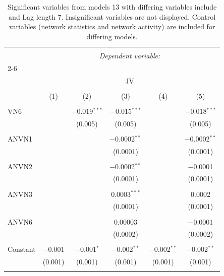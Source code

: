 
\begin{table}[!htbp] \centering 
  \caption{Significant variables from models 13 with differing variables include 
                               and Lag length 7. Insignificant variables are not displayed. 
                               Control variables (network statistics and network activity) are 
                               included for differing models.} 
  \label{Jmodels1_t} 
\scriptsize 
\begin{tabular}{@{\extracolsep{5pt}}lccccc} 
\\[-1.8ex]\hline 
\hline \\[-1.8ex] 
 & \multicolumn{5}{c}{\textit{Dependent variable:}} \\ 
\cline{2-6} 
\\[-1.8ex] & \multicolumn{5}{c}{JV} \\ 
\\[-1.8ex] & (1) & (2) & (3) & (4) & (5)\\ 
\hline \\[-1.8ex] 
 VN6 &  & $-$0.019$^{***}$ & $-$0.015$^{***}$ &  & $-$0.018$^{***}$ \\ 
  &  & (0.005) & (0.005) &  & (0.005) \\ 
  & & & & & \\ 
 ANVN1 &  &  & $-$0.0002$^{**}$ &  & $-$0.0002$^{**}$ \\ 
  &  &  & (0.0001) &  & (0.0001) \\ 
  & & & & & \\ 
 ANVN2 &  &  & $-$0.0002$^{**}$ &  & $-$0.0001 \\ 
  &  &  & (0.0001) &  & (0.0001) \\ 
  & & & & & \\ 
 ANVN3 &  &  & 0.0003$^{***}$ &  & 0.0002 \\ 
  &  &  & (0.0001) &  & (0.0001) \\ 
  & & & & & \\ 
 ANVN6 &  &  & 0.00003 &  & $-$0.0001 \\ 
  &  &  & (0.0002) &  & (0.0002) \\ 
  & & & & & \\ 
 Constant & $-$0.001 & $-$0.001$^{*}$ & $-$0.002$^{**}$ & $-$0.002$^{**}$ & $-$0.002$^{**}$ \\ 
  & (0.001) & (0.001) & (0.001) & (0.001) & (0.001) \\ 
  & & & & & \\ 

\end{tabular}
\end{table}
